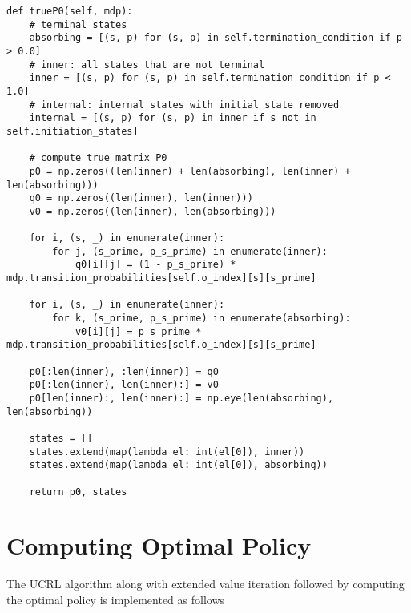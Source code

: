 \begin{verbatim}
def trueP0(self, mdp):
    # terminal states
    absorbing = [(s, p) for (s, p) in self.termination_condition if p > 0.0]
    # inner: all states that are not terminal
    inner = [(s, p) for (s, p) in self.termination_condition if p < 1.0]
    # internal: internal states with initial state removed
    internal = [(s, p) for (s, p) in inner if s not in self.initiation_states]

    # compute true matrix P0
    p0 = np.zeros((len(inner) + len(absorbing), len(inner) + len(absorbing)))
    q0 = np.zeros((len(inner), len(inner)))
    v0 = np.zeros((len(inner), len(absorbing)))

    for i, (s, _) in enumerate(inner):
        for j, (s_prime, p_s_prime) in enumerate(inner):
            q0[i][j] = (1 - p_s_prime) * mdp.transition_probabilities[self.o_index][s][s_prime]

    for i, (s, _) in enumerate(inner):
        for k, (s_prime, p_s_prime) in enumerate(absorbing):
            v0[i][j] = p_s_prime * mdp.transition_probabilities[self.o_index][s][s_prime]

    p0[:len(inner), :len(inner)] = q0
    p0[:len(inner), len(inner):] = v0
    p0[len(inner):, len(inner):] = np.eye(len(absorbing), len(absorbing))

    states = []
    states.extend(map(lambda el: int(el[0]), inner))
    states.extend(map(lambda el: int(el[0]), absorbing))

    return p0, states
\end{verbatim}

\section{Computing Optimal Policy}

The UCRL algorithm along with extended value iteration followed by computing the optimal policy is implemented as follows

